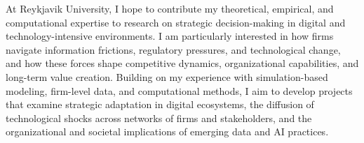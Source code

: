 \documentclass{nfr}
\begin{document}
At Reykjavik University, I hope to contribute my theoretical, empirical, and computational expertise to research on strategic decision-making in digital and technology-intensive environments. 
I am particularly interested in how firms navigate information frictions, regulatory pressures, and technological change, and how these forces shape competitive dynamics, organizational capabilities, and long-term value creation. 
Building on my experience with simulation-based modeling, firm-level data, and computational methods, I aim to develop projects that examine strategic adaptation in digital ecosystems, the diffusion of technological shocks across networks of firms and stakeholders, and the organizational and societal implications of emerging data and AI practices.\\
\end{document}
